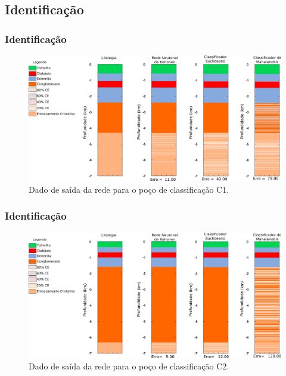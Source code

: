 \documentclass[aspectratio=10]{beamer} %
\begin{document}
\subsection{Identificação}

\begin{frame}
\frametitle{Identificação}
\begin{figure}[H]
\centering
\includegraphics[scale=0.3]{Imagens/IDC1020118.png}
\caption{Dado de saída da rede para o poço de classificação C1.}
\label{Class C1}
\end{figure} 
\end{frame}

\begin{frame}
\frametitle{Identificação}
\begin{figure}[H]
\centering
\includegraphics[scale=0.3]{Imagens/IDC2020118.png}
\caption{Dado de saída da rede para o poço de classificação C2.}
\label{Class C2}
\end{figure} 
\end{frame}
\end{document}
